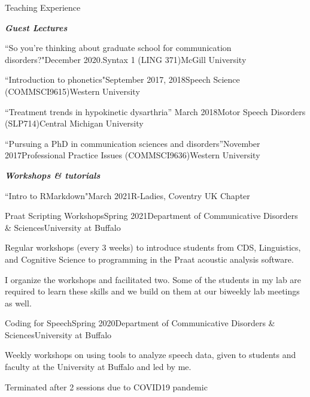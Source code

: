 \documentclass{resume} %
\begin{document}
\begin{rSection}{Teaching Experience}
	
\begin{center}
	{\bf \emph{Guest Lectures}}
\end{center}

	\begin{rSubsection}{``So you're thinking about graduate school for communication disorders?"}{December 2020.}{Syntax 1 (LING 371)}{McGill University}
	\end{rSubsection}

	\begin{rSubsection}{``Introduction to phonetics"}{September 2017, 2018}{Speech Science (COMMSCI9615)}{Western University}
	\end{rSubsection}

	\begin{rSubsection}{``Treatment trends in hypokinetic dysarthria'' }{March 2018}{Motor Speech Disorders (SLP714)}{Central Michigan University}
	\end{rSubsection}
	
	\begin{rSubsection}{``Pursuing a PhD in communication sciences and disorders''}{November 2017}{Professional Practice Issues (COMMSCI9636)}{Western University}
	\end{rSubsection}

\begin{center}
		{\bf \emph{Workshops \& tutorials}}
\end{center}

	\begin{rSubsection}{``Intro to RMarkdown"}{March 2021}{R-Ladies, Coventry UK Chapter}{}
	\end{rSubsection}

	\begin{rSubsection}{Praat Scripting Workshops}{Spring 2021}{Department of Communicative Disorders \& Sciences}{University at Buffalo}
		\item Regular workshops (every 3 weeks) to introduce students from CDS, Linguistics, and Cognitive Science to programming in the Praat acoustic analysis software.
		\item I organize the workshops and facilitated two. Some of the students in my lab are required to learn these skills and we build on them at our biweekly lab meetings as well.
	\end{rSubsection}

	\begin{rSubsection}{Coding for Speech}{Spring 2020}{Department of Communicative Disorders \& Sciences}{University at Buffalo}
		\item Weekly workshops on using tools to analyze speech data, given to students and faculty at the University at Buffalo and led by me.
		\item Terminated after 2 sessions due to COVID19 pandemic
	\end{rSubsection}


\end{rSection}
\end{document}
